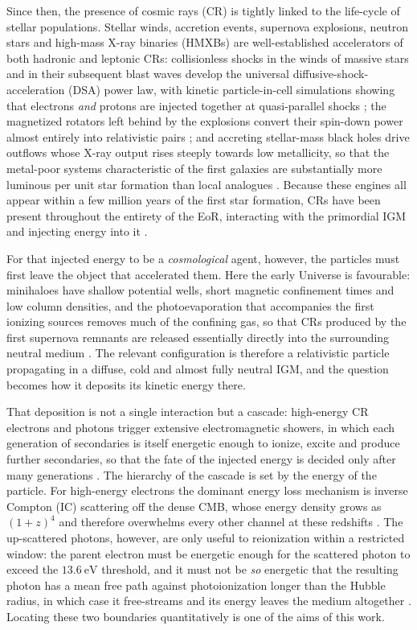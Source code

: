 Since then, the presence of cosmic rays (CR) is tightly linked to the
life-cycle of stellar populations. Stellar winds, accretion events, supernova
explosions, neutron stars and high-mass X-ray binaries (HMXBs) are
well-established accelerators of both hadronic and leptonic CRs: collisionless
shocks in the winds of massive stars and in their subsequent blast waves
develop the universal diffusive-shock-acceleration (DSA) power law, with
kinetic particle-in-cell simulations showing that electrons \emph{and} protons
are injected together at quasi-parallel shocks
\citep{Aharonian2019,Park2015}; the magnetized rotators left behind by the
explosions convert their spin-down power almost entirely into relativistic
pairs \citep{Bykov2017}; and accreting stellar-mass black holes drive outflows
whose X-ray output rises steeply towards low metallicity, so that the
metal-poor systems characteristic of the first galaxies are substantially more
luminous per unit star formation than local analogues
\citep{Mirabel2011,Kaur2022}. Because these engines all appear within a few
million years of the first star formation, CRs have been present throughout
the entirety of the EoR, interacting with the primordial IGM and injecting
energy into it \citep{Sazonov2015,Leite2017,Ruszkowski2023}.

For that injected energy to be a \emph{cosmological} agent, however, the
particles must first leave the object that accelerated them. Here the early
Universe is favourable: minihaloes have shallow potential wells, short magnetic
confinement times and low column densities, and the photoevaporation that
accompanies the first ionizing sources removes much of the confining gas, so
that CRs produced by the first supernova remnants are released essentially
directly into the surrounding neutral medium
\citep{Sazonov2015,Leite2017,Jana2018}. The relevant configuration is
therefore a relativistic particle propagating in a diffuse, cold and almost
fully neutral IGM, and the question becomes how it deposits its kinetic energy
there.

That deposition is not a single interaction but a cascade: high-energy CR
electrons and photons trigger extensive electromagnetic showers, in which each
generation of secondaries is itself energetic enough to ionize, excite and
produce further secondaries, so that the fate of the injected energy is decided
only after many generations \citep{Valdes2010,Slatyer2016}. The hierarchy of
the cascade is set by the energy of the particle. For high-energy electrons
the dominant energy loss mechanism is inverse Compton (IC) scattering off the
dense CMB, whose energy density grows as $(1+z)^{4}$ and therefore overwhelms
every other channel at these redshifts \citep{Blumenthal1970,Gould1972}. The
up-scattered photons, however, are only useful to reionization within a
restricted window: the parent electron must be energetic enough for the
scattered photon to exceed the $13.6\ \mathrm{eV}$ threshold, and it must not
be \emph{so} energetic that the resulting photon has a mean free path against
photoionization longer than the Hubble radius, in which case it free-streams
and its energy leaves the medium altogether \citep{Zdziarski1989,Slatyer2016}.
Locating these two boundaries quantitatively is one of the aims of this work.

